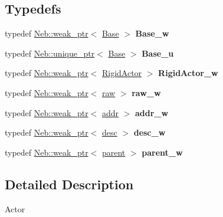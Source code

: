 \subsection*{\-Typedefs}
{\bf }\par
\begin{DoxyCompactItemize}
\item 
\hypertarget{namespaceNeb_1_1Actor_aebecc9fc0c543f20fcffa4fa39fe7a7f}{typedef \hyperlink{classNeb_1_1weak__ptr}{\-Neb\-::weak\-\_\-ptr}$<$ \hyperlink{classNeb_1_1Actor_1_1Base}{\-Base} $>$ {\bfseries \-Base\-\_\-w}}\label{namespaceNeb_1_1Actor_aebecc9fc0c543f20fcffa4fa39fe7a7f}

\item 
\hypertarget{namespaceNeb_1_1Actor_a99beee505d795cd02efecf2b49fe5577}{typedef \hyperlink{classNeb_1_1unique__ptr}{\-Neb\-::unique\-\_\-ptr}$<$ \hyperlink{classNeb_1_1Actor_1_1Base}{\-Base} $>$ {\bfseries \-Base\-\_\-u}}\label{namespaceNeb_1_1Actor_a99beee505d795cd02efecf2b49fe5577}

\item 
\hypertarget{namespaceNeb_1_1Actor_a582f5119d9a59cbc1fa042196d01bb4e}{typedef \hyperlink{classNeb_1_1weak__ptr}{\-Neb\-::weak\-\_\-ptr}$<$ \hyperlink{classNeb_1_1Actor_1_1RigidActor}{\-Rigid\-Actor} $>$ {\bfseries \-Rigid\-Actor\-\_\-w}}\label{namespaceNeb_1_1Actor_a582f5119d9a59cbc1fa042196d01bb4e}

\item 
\hypertarget{namespaceNeb_1_1Actor_a6b47d877ea1ae0505306c281f65f30fa}{typedef \hyperlink{classNeb_1_1weak__ptr}{\-Neb\-::weak\-\_\-ptr}$<$ \hyperlink{classNeb_1_1Actor_1_1raw}{raw} $>$ {\bfseries raw\-\_\-w}}\label{namespaceNeb_1_1Actor_a6b47d877ea1ae0505306c281f65f30fa}

\item 
\hypertarget{namespaceNeb_1_1Actor_a0fbf0b60bc1e1a788cf928db172a7f42}{typedef \hyperlink{classNeb_1_1weak__ptr}{\-Neb\-::weak\-\_\-ptr}$<$ \hyperlink{classNeb_1_1Actor_1_1addr}{addr} $>$ {\bfseries addr\-\_\-w}}\label{namespaceNeb_1_1Actor_a0fbf0b60bc1e1a788cf928db172a7f42}

\item 
\hypertarget{namespaceNeb_1_1Actor_ac603fe9e781b5144d265d79465517bc6}{typedef \hyperlink{classNeb_1_1weak__ptr}{\-Neb\-::weak\-\_\-ptr}$<$ \hyperlink{classNeb_1_1Actor_1_1desc}{desc} $>$ {\bfseries desc\-\_\-w}}\label{namespaceNeb_1_1Actor_ac603fe9e781b5144d265d79465517bc6}

\item 
\hypertarget{namespaceNeb_1_1Actor_a2af6911fc9dbf37f305439efed56e1e8}{typedef \hyperlink{classNeb_1_1weak__ptr}{\-Neb\-::weak\-\_\-ptr}$<$ \hyperlink{classNeb_1_1Actor_1_1parent}{parent} $>$ {\bfseries parent\-\_\-w}}\label{namespaceNeb_1_1Actor_a2af6911fc9dbf37f305439efed56e1e8}

\end{DoxyCompactItemize}



\subsection{\-Detailed \-Description}
\-Actor 